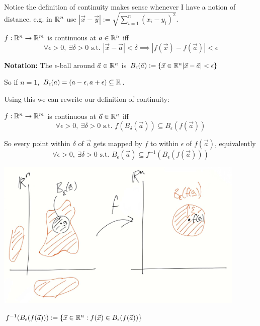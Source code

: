 \documentclass[twoside]{scrartcl}
\begin{document}
Notice 
 the definition of continuity makes sense whenever I have a notion of distance.  e.g. in $\mathbb{R}^n$ use $|\vec{x} - \vec{y}| := \sqrt{\sum_{i=1}^n (x_i - y_i)^2}$.\\

\begin{definition}
$f: \mathbb{R}^n \to \mathbb{R}^m$ is continuous at $a \in \mathbb{R}^n$ iff 
\[\forall \epsilon >0,~\exists \delta >0 \text{ s.t. } |\vec{x} - \vec{a}| < \delta \implies |f(\vec{x}) - f(\vec{a})| < \epsilon\]	
\end{definition}

\textbf{Notation:} The $\epsilon$-ball around $\vec{a}\in\mathbb{R}^n$ is $B_\epsilon(\vec{a}) := \{\vec{x} \in \mathbb{R}^n |\vec{x} - \vec{a}| < \epsilon\}$

So if $n = 1$, $B_\epsilon(a) = (a-\epsilon, a + \epsilon) \subseteq \mathbb{R}$. 

Using this we can rewrite our definition of continuity:\\

\begin{definition}
$f: \mathbb{R}^n \to \mathbb{R}^m$ is continuous at $\vec{a} \in \mathbb{R}^n$ iff 
\[\forall \epsilon > 0,~\exists \delta > 0 \text{ s.t. } f(B_\delta(\vec{a})) \subseteq B_\epsilon(f(\vec{a}))\]	
\end{definition}

So every point within $\delta$ of $\vec{a}$ gets mapped by $f$ to within $\epsilon$ of $f(\vec{a})$, equivalently 
\[\boxed{\forall \epsilon > 0,~\exists \delta > 0 \text{ s.t. } B_\epsilon(\vec{a}) \subseteq f^{-1}(B_\epsilon(f(\vec{a})))}\]


\begin{center}
\includegraphics[width = 12cm]{ball1.jpg}
\end{center}


$f^{-1}(B_\epsilon(f(\vec{a}))) := \{\vec{x} \in \mathbb{R}^n : f(\vec{x}) \in B_\epsilon (f(\vec{a}))\}$
\end{document}
